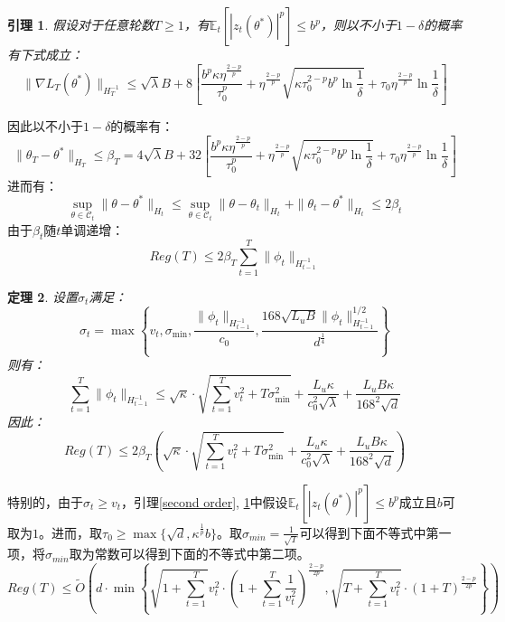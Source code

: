 \documentclass[UTF8,a4paper,10.5pt]{ctexart}
\newcommand{\Ccal}{\mathcal C}
\newcommand{\E}{\mathbb{E}}
\newtheorem{theorem}{定理}[section]
\newtheorem{lemma}[theorem]{引理}
\begin{document}
\begin{lemma}
	假设对于任意轮数$T \geq 1$，有$\E_t[|z_t(\theta^*)|^p]\leq b^p$，则以不小于$1-\delta$的概率有下式成立：
\begin{equation}
	\|\nabla L_T(\theta^*)\|_{H_T^{-1}} \leq \sqrt{\lambda}B + 8\left[\frac{b^p\kappa \eta^{\frac{2-p}{p}}}{\tau_0^{p}} + \eta^{\frac{2-p}{p}}\sqrt{\kappa \tau_0^{2-p} b^p \ln\frac{1}{\delta}}+ \tau_0 \eta^{\frac{2-p}{p}}\ln\frac{1}{\delta}\right] 
\end{equation}
	\label{first order}
\end{lemma}
因此以不小于$1-\delta$的概率有：
\begin{equation}
	\|\theta_T - \theta^*\|_{H_T} \leq \beta_T = 4\sqrt{\lambda}B + 32\left[\frac{b^p\kappa \eta^{\frac{2-p}{p}}}{\tau_0^{p}} + \eta^{\frac{2-p}{p}}\sqrt{\kappa \tau_0^{2-p} b^p \ln\frac{1}{\delta}}+ \tau_0 \eta^{\frac{2-p}{p}}\ln\frac{1}{\delta}\right] 
\end{equation}
进而有：
\begin{equation*}
	\sup_{\theta\in \Ccal_t}\|\theta - \theta^*\|_{H_t} \leq \sup_{\theta \in \Ccal_t}\|\theta - \theta_t\|_{H_t} + \|\theta_t - \theta^*\|_{H_t} \leq 2\beta_t
\end{equation*}
由于$\beta_t$随$t$单调递增：
\begin{equation*}
	Reg(T)\leq 2\beta_T \sum_{t=1}^{T}\|\phi_t\|_{H_{t-1}^{-1}}
\end{equation*}
\begin{theorem}
	设置$\sigma_t$满足：
	\begin{equation*}
		\sigma_t= \max\left\{v_t, \sigma_{\min}, \frac{\|\phi_t\|_{H_{t-1}^{-1}}}{c_0}, \frac{168\sqrt{L_uB}\|\phi_t\|^{1/2}_{H_{t-1}^{-1}}}{d^{\frac{1}{4}}}\right\}
	\end{equation*}
	则有：
	\begin{equation*}
		\sum_{t=1}^{T}\|\phi_t\|_{H_{t-1}^{-1}}  \leq \sqrt{\kappa}\cdot \sqrt{\sum_{t=1}^{T}v_t^2+T\sigma_{\min}^2} + \frac{L_u\kappa}{c_0^2\sqrt{\lambda}} + \frac{L_uB\kappa}{168^2\sqrt{d}}
	\end{equation*}
	\label{sum_phi}
	因此：
	\begin{equation}
		Reg(T)\leq 2\beta_T \left(\sqrt{\kappa}\cdot \sqrt{\sum_{t=1}^{T}v_t^2+T\sigma_{\min}^2} + \frac{L_u\kappa}{c_0^2\sqrt{\lambda}} + \frac{L_uB\kappa}{168^2\sqrt{d}}\right)
	\end{equation}
\end{theorem}


特别的，由于$\sigma_t\geq v_t$，引理\ref{second order}, \ref{first order}中假设$\E_t[|z_t(\theta^*)|^p]\leq b^p$成立且$b$可取为$1$。进而，取$\tau_0 \geq \max\{\sqrt{d}, \kappa^{\frac{1}{p}}b\}$。取$\sigma_{min} = \frac{1}{\sqrt{T}}$可以得到下面不等式中第一项，将$\sigma_{min}$取为常数可以得到下面的不等式中第二项。
\begin{equation}
	Reg(T)\leq \tilde{O}\left(d\cdot\min \left\{\sqrt{1+\sum_{t=1}^{T}}v_t^2\cdot \left(1+\sum_{t=1}^{T}\frac{1}{v_t^2}\right)^{\frac{2-p}{2p}} ,\sqrt{T + \sum_{t=1}^{T}v_t^2}\cdot(1+T)^{\frac{2-p}{2p}}\right\}\right) 
	\label{final_regret}
\end{equation}
\end{document}
